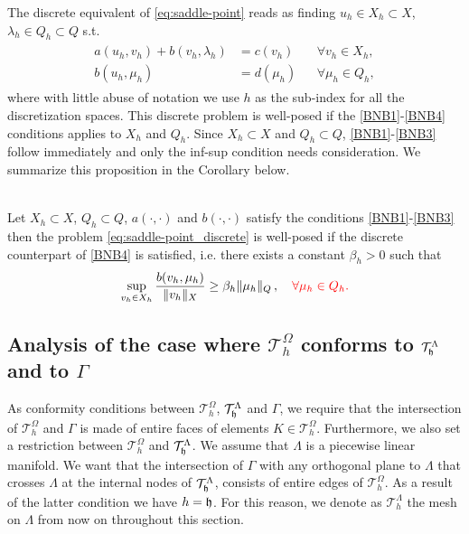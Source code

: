 \documentclass[r]{siamart171218}
\newcommand{\kent}[1]{{\color{red}#1}}
\begin{document}
The discrete equivalent of \eqref{eq:saddle-point} reads as finding $u_h\in X_h\subset X$, $\lambda_h\in Q_h\subset Q$ s.t.
\begin{eqnarray}\label{eq:saddle-point_discrete}
\begin{aligned}
a(u_h,v_h)+b(v_h,\lambda_h)&=c(v_h) &&\forall v_h\in X_h,\\
b(u_h,\mu_h)&=d(\mu_h) &&\forall \mu_h\in Q_h,
\end{aligned}
\end{eqnarray}
where with little abuse of notation we use $h$ as the sub-index for all the discretization spaces.
This discrete problem is well-posed if the \eqref{BNB1}-\eqref{BNB4} conditions applies to $X_h$ and $Q_h$. Since $X_h\subset X$ and $Q_h\subset Q$,  
\eqref{BNB1}-\eqref{BNB3} follow immediately and only the inf-sup condition needs consideration.  We summarize this proposition in the Corollary below. 
\begin{corollary}{\cite[Theorem 2.42]{MR2050138}}\\
Let
$X_h \subset X$, $Q_h \subset Q$, $a(\cdot, \cdot)$ and $b(\cdot, \cdot)$ satisfy the conditions  \eqref{BNB1}-\eqref{BNB3} then  
the problem \eqref{eq:saddle-point_discrete} is well-posed if 
the discrete counterpart of \eqref{BNB4} is satisfied, i.e.
there exists a constant $\beta_h>0$ such that
\begin{align}
\label{eq:infsup_discrete}
 \sup_{v_h\in X_h} \frac{b(v_h,\mu_h)}{\|v_h\|_{X}}\geq \beta_h \|\mu_h\|_{Q}\,, \kent{\quad \forall \mu_h \in Q_h.}
\end{align}
\end{corollary}


\subsection{Analysis of the case where $\mathcal{T}^{\Omega}_h$ conforms to $\mathcal{T}^{\Lambda}_{\mathfrak{h}}$ and to $\Gamma$}
As conformity conditions between $\mathcal{T}^{\Omega}_h$, $\mathcal{T}^{\Lambda}_{\mathfrak{h}}$ and $\Gamma$, we require that the intersection of $\mathcal{T}^{\Omega}_h$ and $\Gamma$ is made of entire faces of elements $K \in \mathcal{T}^{\Omega}_h$. Furthermore, we also set a restriction between $\mathcal{T}^{\Omega}_h$ and $\mathcal{T}^{\Lambda}_{\mathfrak{h}}$. We assume that $\Lambda$ is a piecewise linear manifold. We want that the intersection of $\Gamma$ with any orthogonal plane to $\Lambda$ that crosses $\Lambda$ at the internal nodes of $\mathcal{T}^{\Lambda}_{\mathfrak{h}}$, consists of entire edges of $\mathcal{T}^{\Omega}_h$. As a result of the latter condition we have $h=\mathfrak{h}$. 
For this reason, we denote as $\mathcal{T}^{\Lambda}_h$ the mesh on $\Lambda$
from now on throughout this section.
 
\end{document}
